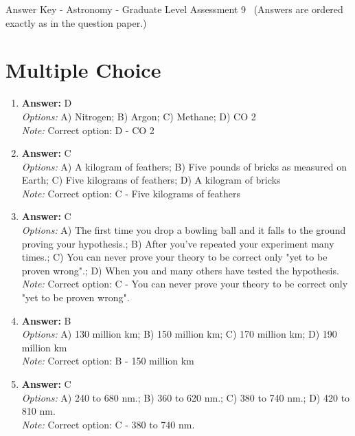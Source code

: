 \documentclass[12pt]{article}
\begin{document}
\begin{center}
Answer Key - Astronomy - Graduate Level Assessment 9 \
\small (Answers are ordered exactly as in the question paper.)
\end{center}

\section*{Multiple Choice}
\begin{enumerate}[label=\arabic*.]
\item \textbf{Answer:} D
\\ \textit{Options:} A) Nitrogen; B) Argon; C) Methane; D) CO 2
\\ \textit{Note:} Correct option: D - CO 2
\item \textbf{Answer:} C
\\ \textit{Options:} A) A kilogram of feathers; B) Five pounds of bricks as measured on Earth; C) Five kilograms of feathers; D) A kilogram of bricks
\\ \textit{Note:} Correct option: C - Five kilograms of feathers
\item \textbf{Answer:} C
\\ \textit{Options:} A) The first time you drop a bowling ball and it falls to the ground proving your hypothesis.; B) After you've repeated your experiment many times.; C) You can never prove your theory to be correct only "yet to be proven wrong".; D) When you and many others have tested the hypothesis.
\\ \textit{Note:} Correct option: C - You can never prove your theory to be correct only "yet to be proven wrong".
\item \textbf{Answer:} B
\\ \textit{Options:} A) 130 million km; B) 150 million km; C) 170 million km; D) 190 million km
\\ \textit{Note:} Correct option: B - 150 million km
\item \textbf{Answer:} C
\\ \textit{Options:} A) 240 to 680 nm.; B) 360 to 620 nm.; C) 380 to 740 nm.; D) 420 to 810 nm.
\\ \textit{Note:} Correct option: C - 380 to 740 nm.
\end{enumerate}
\end{document}
